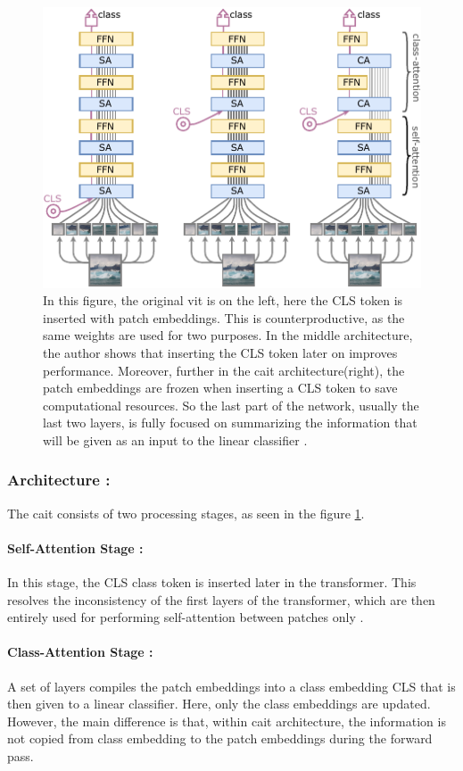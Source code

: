 \clearpage
\begin{figure}[ht!]
    \centering
    \includegraphics[width=0.75\linewidth]{Rohit_Master_Thesis//Images/cait_architecture.pdf}
    \caption{In this figure, the original \gls{vit} is on the left, here the CLS token is inserted with patch embeddings. This is counterproductive, as the same weights are used for two purposes. In the middle architecture, the author shows that inserting the CLS token later on improves performance. Moreover, further in the \gls{cait} architecture(right), the patch embeddings are frozen when inserting a CLS token to save computational resources. So the last part of the network, usually the last two layers, is fully focused on summarizing the information that will be given as an input to the linear classifier \cite{touvron2021going}.}
    \label{fig:cait architecture}
\end{figure}

\subsubsection*{Architecture :}

The \gls{cait} consists of two processing stages, as seen in the figure \ref{fig:cait architecture}.

\paragraph{Self-Attention Stage :} In this stage, the CLS class token is inserted later in the transformer. This resolves the inconsistency of the first layers of the transformer, which are then entirely used for performing self-attention between patches only \cite{touvron2021going}. 

\paragraph{Class-Attention Stage :} A set of layers compiles the patch embeddings into a class embedding CLS that is then given to a linear classifier. Here, only the class embeddings are updated. However, the main difference is that, within \gls{cait} architecture, the information is not copied from class embedding to the patch embeddings during the forward pass.

